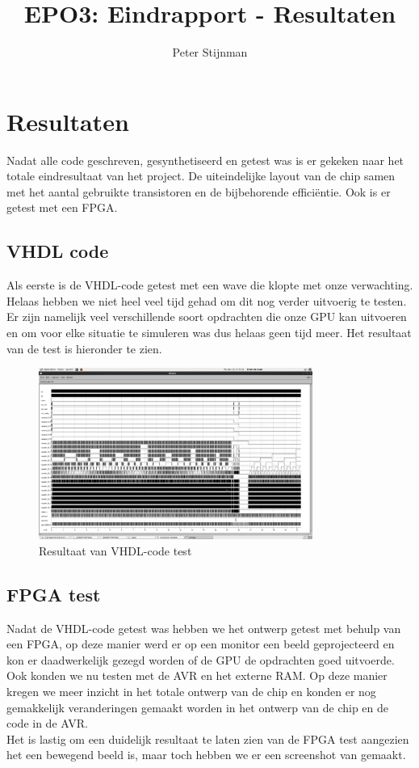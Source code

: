 \documentclass{scrartcl} %
\author{Peter Stijnman}
\title{EPO3: Eindrapport - Resultaten}
\begin{document}
\chapter{Resultaten}
\label{ch:resultaten}


Nadat alle code geschreven, gesynthetiseerd en getest was is er gekeken naar het totale eindresultaat van het project. De uiteindelijke layout van de chip samen met het aantal gebruikte transistoren en de bijbehorende efficiëntie. Ook is er getest met een FPGA.

\section{VHDL code}

Als eerste is de VHDL-code getest met een wave die klopte met onze verwachting. Helaas hebben we niet heel veel tijd gehad om dit nog verder uitvoerig te testen. Er zijn namelijk veel verschillende soort opdrachten die onze GPU kan uitvoeren en om voor elke situatie te simuleren was dus helaas geen tijd meer. Het resultaat van de test is hieronder te zien.

\begin{figure}[H]
	\centering
	\includegraphics[width=0.8\textwidth]{layout_sls_wave}
	\caption{Resultaat van VHDL-code test}
\end{figure}



\section{FPGA test}

Nadat de VHDL-code getest was hebben we het ontwerp getest met behulp van een FPGA, op deze manier werd er op een monitor een beeld geprojecteerd en kon er daadwerkelijk gezegd worden of de GPU de opdrachten goed uitvoerde. Ook konden we nu testen met de AVR en het externe RAM. Op deze manier kregen we meer inzicht in het totale ontwerp van de chip en konden er nog gemakkelijk veranderingen gemaakt worden in het ontwerp van de chip en de code in de AVR.\\  Het is lastig om een duidelijk resultaat te laten zien van de FPGA test aangezien het een bewegend beeld is, maar toch hebben we er een screenshot van gemaakt.
\end{document}
